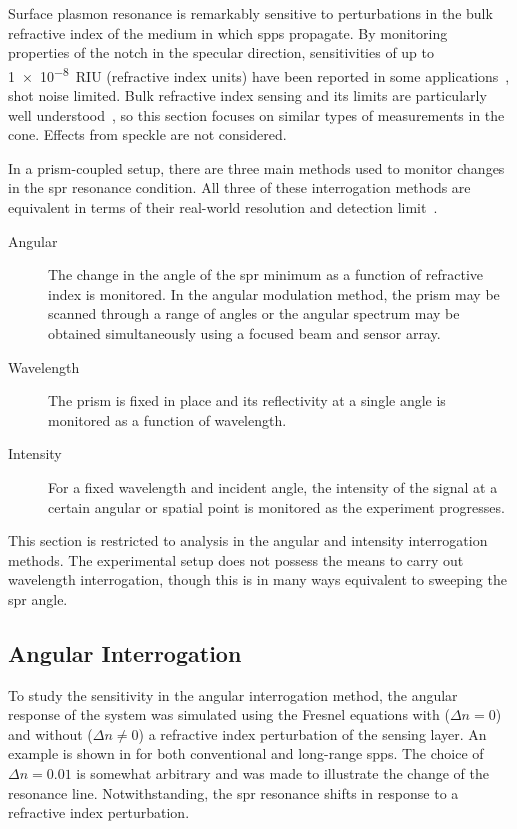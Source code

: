 Surface plasmon resonance is remarkably sensitive to perturbations in the bulk
refractive index of the medium in which \glspl{spp} propagate.  By monitoring
properties of the notch in the specular direction, sensitivities of up to
\SI{1e-8}{RIU} (refractive index units) have been reported in some
applications~\cite{fan2008sensitive}, shot noise limited.  Bulk refractive
index sensing and its limits are particularly well
understood~\cite{piliarik2009surface}, so this section focuses on similar types
of measurements in the cone.  Effects from speckle are not considered.

In a prism-coupled setup, there are three main methods used to monitor changes
in the \gls{spr} resonance condition.  All three of these interrogation methods are
equivalent in terms of their real-world resolution and detection
limit~\cite{homola2006surface}.
\begin{description}
  \item [{Angular}] The change in the angle of the \gls{spr} minimum as a function
        of refractive index is monitored.  In the angular modulation method,
        the prism may be scanned through a range of angles or the angular
        spectrum may be obtained simultaneously using a focused beam and
        sensor array.
  \item [{Wavelength}] The prism is fixed in place and its reflectivity at
        a single angle is monitored as a function of wavelength.
  \item [{Intensity}] For a fixed wavelength and incident angle, the
        intensity of the signal at a certain angular or spatial point is
        monitored as the experiment progresses.
\end{description}
This section is restricted to analysis in the angular and intensity
interrogation methods.  The experimental setup does not possess the means to
carry out wavelength interrogation, though this is in many ways equivalent to
sweeping the \gls{spr} angle.

\subsection{Angular Interrogation}
To study the sensitivity in the angular interrogation method, the angular
response of the system was simulated using the Fresnel equations with ($\Delta
  n = 0$) and without ($\Delta n \ne 0$) a refractive index perturbation of the
sensing layer.  An example is shown in  for both
conventional and long-range \glspl{spp}.  The choice of $\Delta n = 0.01$ is somewhat
arbitrary and was made to illustrate the change of the resonance line.
Notwithstanding, the \gls{spr} resonance shifts in response to a refractive index
perturbation.

